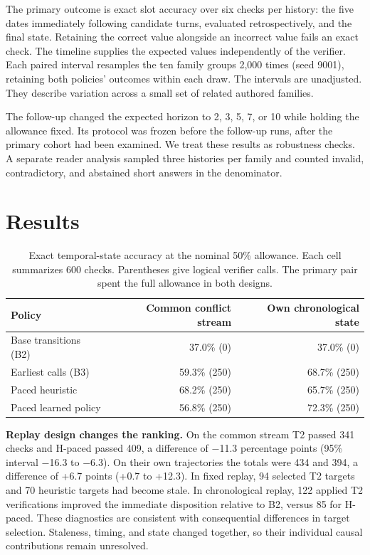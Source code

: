 \documentclass[11pt]{article}
\begin{document}
The primary outcome is exact slot accuracy over six checks per history: the five dates immediately following candidate turns, evaluated retrospectively, and the final state. Retaining the correct value alongside an incorrect value fails an exact check. The timeline supplies the expected values independently of the verifier. Each paired interval resamples the ten family groups 2,000 times (seed 9001), retaining both policies’ outcomes within each draw. The intervals are unadjusted. They describe variation across a small set of related authored families.

The follow-up changed the expected horizon to 2, 3, 5, 7, or 10 while holding the allowance fixed. Its protocol was frozen before the follow-up runs, after the primary cohort had been examined. We treat these results as robustness checks. A separate reader analysis sampled three histories per family and counted invalid, contradictory, and abstained short answers in the denominator.

\section{Results}

\begin{table}[htbp]\centering\small

\caption{Exact temporal-state accuracy at the nominal 50\% allowance. Each cell summarizes 600 checks. Parentheses give logical verifier calls. The primary pair spent the full allowance in both designs.}

\begin{tabularx}{\linewidth}{@{}Xrr@{}}\toprule
Policy & Common conflict stream & Own chronological state \\
\midrule
Base transitions (B2) & 37.0\% (0) & 37.0\% (0) \\
Earliest calls (B3) & 59.3\% (250) & 68.7\% (250) \\
Paced heuristic & 68.2\% (250) & 65.7\% (250) \\
Paced learned policy & 56.8\% (250) & 72.3\% (250) \\
\bottomrule\end{tabularx}

\end{table}

\textbf{Replay design changes the ranking.} On the common stream T2 passed 341 checks and H-paced passed 409, a difference of \ensuremath{-}11.3 percentage points (95\% interval \ensuremath{-}16.3 to \ensuremath{-}6.3). On their own trajectories the totals were 434 and 394, a difference of +6.7 points (+0.7 to +12.3). In fixed replay, 94 selected T2 targets and 70 heuristic targets had become stale. In chronological replay, 122 applied T2 verifications improved the immediate disposition relative to B2, versus 85 for H-paced. These diagnostics are consistent with consequential differences in target selection. Staleness, timing, and state changed together, so their individual causal contributions remain unresolved.
\end{document}
